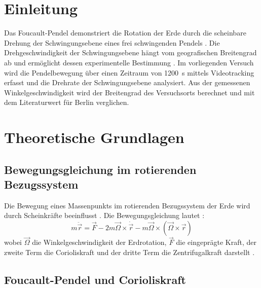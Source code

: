\documentclass[a4paper,12pt]{article}
\begin{document}
\tableofcontents
\newpage

\section{Einleitung}

Das Foucault-Pendel demonstriert die Rotation der Erde durch die scheinbare Drehung der Schwingungsebene eines frei schwingenden Pendels \cite[S.~89]{demtroeder2018}. Die Drehgeschwindigkeit der Schwingungsebene hängt vom geografischen Breitengrad ab und ermöglicht dessen experimentelle Bestimmung \cite[S.~156]{nolting2023}. Im vorliegenden Versuch wird die Pendelbewegung über einen Zeitraum von \qty{1200}{s} mittels Videotracking erfasst und die Drehrate der Schwingungsebene analysiert. Aus der gemessenen Winkelgeschwindigkeit wird der Breitengrad des Versuchsorts berechnet und mit dem Literaturwert für Berlin verglichen.

\section{Theoretische Grundlagen}

\subsection{Bewegungsgleichung im rotierenden Bezugssystem}

Die Bewegung eines Massenpunkts im rotierenden Bezugssystem der Erde wird durch Scheinkräfte beeinflusst \cite[S.~154]{nolting2023}. Die Bewegungsgleichung lautet \cite[S.~155]{nolting2023}:
\begin{equation}
m\ddot{\vec{r}} = \vec{F} - 2m\vec{\Omega}\times\dot{\vec{r}} - m\vec{\Omega}\times(\vec{\Omega}\times\vec{r})
\label{eq:bewegung_rotierend}
\end{equation}
wobei $\vec{\Omega}$ die Winkelgeschwindigkeit der Erdrotation, $\vec{F}$ die eingeprägte Kraft, der zweite Term die Corioliskraft und der dritte Term die Zentrifugalkraft darstellt \cite[S.~155]{nolting2023}.

\subsection{Foucault-Pendel und Corioliskraft}
\end{document}
